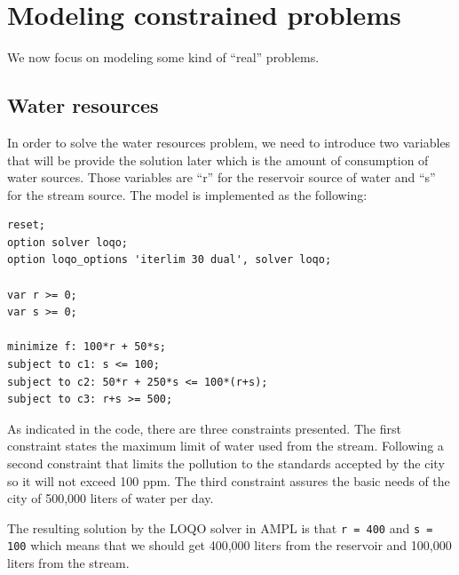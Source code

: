 \section{Modeling constrained problems}
We now focus on modeling some kind of “real” problems.
\subsection{Water resources}
In order to solve the water resources problem, we need to introduce two variables that will be provide the solution later which is the amount of consumption of water sources. Those variables are ``r'' for the reservoir source of water and ``s'' for the stream source. The model is implemented as the following:
\begin{verbatim}
reset;
option solver loqo;
option loqo_options 'iterlim 30 dual', solver loqo;

var r >= 0;
var s >= 0;

minimize f: 100*r + 50*s;
subject to c1: s <= 100;
subject to c2: 50*r + 250*s <= 100*(r+s);
subject to c3: r+s >= 500;
\end{verbatim}
As indicated in the code, there are three constraints presented. The first constraint states the maximum limit of water used from the stream. Following a second constraint that limits the pollution to the standards accepted by the city so it will not exceed 100 ppm. The third constraint assures the basic needs of the city of 500,000 liters of water per day.

The resulting solution by the LOQO solver in AMPL is that \texttt{r = 400} and \texttt{s = 100} which means that we should get 400,000 liters from the reservoir and 100,000 liters from the stream.

